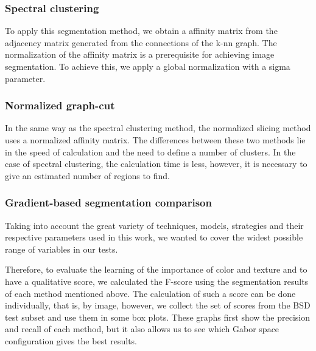 \subsubsection{Spectral clustering}
To apply this segmentation method, we obtain a affinity matrix from the adjacency matrix generated from the connections of the k-nn graph. The normalization of the affinity matrix is a prerequisite for achieving image segmentation. To achieve this, we apply a global normalization with a sigma parameter.


\subsubsection{Normalized graph-cut}
In the same way as the spectral clustering method, the normalized slicing method uses a normalized affinity matrix. The differences between these two methods lie in the speed of calculation and the need to define a number of clusters. In the case of spectral clustering, the calculation time is less, however, it is necessary to give an estimated number of regions to find.

\subsubsection{Gradient-based segmentation comparison}

Taking into account the great variety of techniques, models, strategies and their respective parameters used in this work, we wanted to cover the widest possible range of variables in our tests.

Therefore, to evaluate the learning of the importance of color and texture and to have a qualitative score, we calculated the F-score using the segmentation results of each method mentioned above. The calculation of such a score can be done individually, that is, by image, however, we collect the set of scores from the BSD test subset and use them in some box plots. These graphs first show the precision and recall of each method, but it also allows us to see which Gabor space configuration gives the best results.


